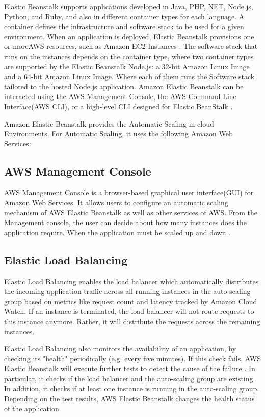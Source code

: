 \documentclass[9pt,twocolumn,twoside]{../../styles/osajnl}
\begin{document}
Elastic Beanstalk supports applications developed in Java, PHP, NET,
Node.js, Python, and Ruby, and also in different container types for
each language. A container defines the infrastructure and software
stack to be used for a given environment. When an application is
deployed, Elastic Beanstalk provisions one or moreAWS resources, such
as Amazon EC2 Instances \cite{elastic-beanstalk-book}. The software
stack that runs on the instances depends on the container type, where
two container types are supported by the Elastic Beanstalk Node.js: a
32-bit Amazon Linux Image and a 64-bit Amazon Linux Image. Where \GE each
of them runs the Software stack tailored to the hosted Node.js
application. Amazon Elastic Beanstalk can be interacted using the AWS
Management Console, the AWS Command Line Interface(AWS CLI), or a
high-level CLI designed for Elastic BeanStalk
\cite{elastic-beanstalk-book}.

Amazon Elastic Beanstalk provides the Automatic Scaling in cloud
Environments.  For Automatic Scaling, it uses the following Amazon Web
Services:

\subsection{AWS Management Console}

AWS Management Console is a browser-based graphical user
interface(GUI) for Amazon Web Services. It allows users to configure
an automatic scaling mechanism of AWS Elastic Beanstalk as well as
other services of AWS. From the Management console, the user can decide
about how many instances does the application require. When the
application must be scaled up and down \cite{elastic-beanstalk}.

\subsection{Elastic Load Balancing}
 
Elastic Load Balancing enables the load balancer which automatically
distributes the incoming application traffic across all running
instances in the auto-scaling group based on metrics like request count
and latency tracked by Amazon Cloud Watch. If an instance is
terminated, the load balancer will not route requests to this instance
anymore. Rather, it will distribute the requests across the remaining
instances.
    
Elastic Load Balancing also monitors the availability of an
application, by checking its "health" periodically (e.g. every five
minutes). If this check fails, AWS Elastic Beanstalk will execute
further tests to detect the cause of the failure
\cite{elastic-loadbalancing}. In particular, it checks if the load
balancer and the auto-scaling group are existing.  In addition, it
checks if at least one instance is running in the auto-scaling
group. Depending on the test results, AWS Elastic Beanstalk changes
the health status of the application.
    
\end{document}
